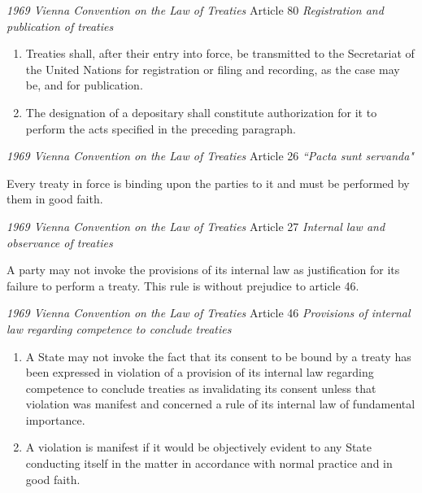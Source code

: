 \begin{conventiondetails}{\textit{1969 Vienna Convention on the Law of Treaties} Article 80}
    \flushleft
    \textit{Registration and publication of treaties}

    \begin{enumerate}
        \item Treaties shall, after their entry into force, be transmitted to the Secretariat of the United Nations for registration or filing and recording, as the case may be, and for publication. 
        \item The designation of a depositary shall constitute authorization for it to perform the acts specified in the preceding paragraph.
    \end{enumerate}
\end{conventiondetails}

\begin{conventiondetails}{\textit{1969 Vienna Convention on the Law of Treaties} Article 26}\label{VCLT Art 26}
    \flushleft
    \textit{``Pacta sunt servanda"}
    \vspace{\baselineskip}

    Every treaty in force is binding upon the parties to it and must be performed by them in good faith.
\end{conventiondetails}

\begin{conventiondetails}{\textit{1969 Vienna Convention on the Law of Treaties} Article 27}\label{VCLT Art 27}
    \flushleft
    \textit{Internal law and observance of treaties}

    \vspace{\baselineskip}

    A party may not invoke the provisions of its internal law as justification for its failure to perform  a treaty. This rule is without prejudice to article 46.
\end{conventiondetails}

\begin{conventiondetails}{\textit{1969 Vienna Convention on the Law of Treaties} Article 46}
    \flushleft
    \textit{Provisions of internal law regarding competence to conclude treaties}

    \begin{enumerate}
        \item A State may not invoke the fact that its consent to be bound by a treaty has been expressed in violation of a provision of its internal law regarding competence to conclude treaties as invalidating its consent unless that violation was manifest and concerned a rule of its internal law of fundamental importance. 
        \item A violation is manifest if it would be objectively evident to any State conducting itself in the matter in accordance with normal practice and in good faith.
    \end{enumerate}
\end{conventiondetails}

